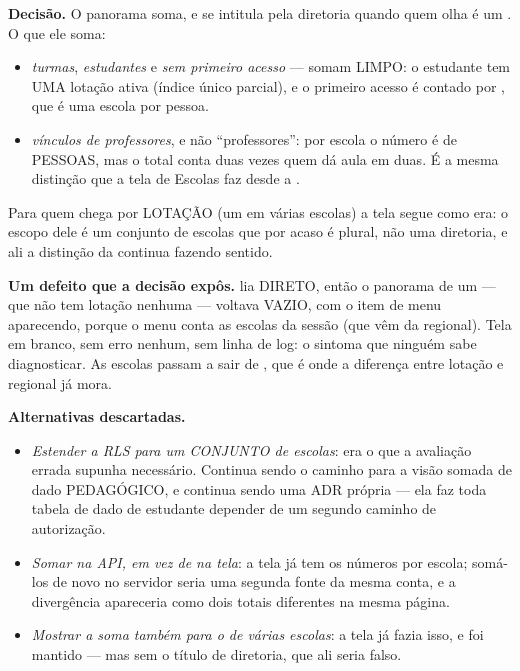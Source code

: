 \textbf{Decisão.} O panorama soma, e se intitula pela diretoria quando quem olha
é um . O que ele soma:

\begin{itemize}
  \item \emph{turmas}, \emph{estudantes} e \emph{sem primeiro acesso} --- somam
    LIMPO: o estudante tem UMA lotação ativa (índice único parcial), e o primeiro
    acesso é contado por , que é uma escola por pessoa.
  \item \emph{vínculos de professores}, e não \enquote{professores}: por escola o
    número é de PESSOAS, mas o total conta duas vezes quem dá aula em duas. É a
    mesma distinção que a tela de Escolas faz desde a .
\end{itemize}

Para quem chega por LOTAÇÃO (um  em várias escolas) a tela
segue como era: o escopo dele é um conjunto de escolas que por acaso é plural,
não uma diretoria, e ali a distinção da  continua fazendo sentido.

\textbf{Um defeito que a decisão expôs.}  lia
 DIRETO, então o panorama de um  --- que não tem
lotação nenhuma --- voltava VAZIO, com o item de menu aparecendo, porque o menu
conta as escolas da sessão (que vêm da regional). Tela em branco, sem erro
nenhum, sem linha de log: o sintoma que ninguém sabe diagnosticar. As escolas
passam a sair de , que é onde a diferença entre lotação e
regional já mora.

\textbf{Alternativas descartadas.}
\begin{itemize}
  \item \emph{Estender a RLS para um CONJUNTO de escolas}: era o que a avaliação
    errada supunha necessário. Continua sendo o caminho para a visão somada de
    dado PEDAGÓGICO, e continua sendo uma ADR própria --- ela faz toda tabela de
    dado de estudante depender de um segundo caminho de autorização.
  \item \emph{Somar na API, em vez de na tela}: a tela já tem os números por
    escola; somá-los de novo no servidor seria uma segunda fonte da mesma conta,
    e a divergência apareceria como dois totais diferentes na mesma página.
  \item \emph{Mostrar a soma também para o  de várias
    escolas}: a tela já fazia isso, e foi mantido --- mas sem o título de
    diretoria, que ali seria falso.
\end{itemize}

